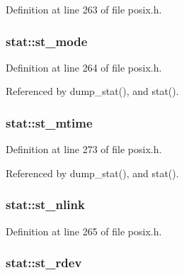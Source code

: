 Definition at line 263 of file posix.\-h.

\hypertarget{structstat_a5cbdd829011af82ba61e83773bbcbc7d}{
\subsubsection[{st\-\_\-mode}]{ stat\-::st\-\_\-mode}}\label{structstat_a5cbdd829011af82ba61e83773bbcbc7d}


Definition at line 264 of file posix.\-h.



Referenced by dump\-\_\-stat(), and stat().

\hypertarget{structstat_a77e235090f8cb6897f1c0ce65689006b}{
\subsubsection[{st\-\_\-mtime}]{ stat\-::st\-\_\-mtime}}\label{structstat_a77e235090f8cb6897f1c0ce65689006b}


Definition at line 273 of file posix.\-h.



Referenced by dump\-\_\-stat(), and stat().

\hypertarget{structstat_a0ed9092fa6c77a3251b9b9a4738ef84f}{
\subsubsection[{st\-\_\-nlink}]{ stat\-::st\-\_\-nlink}}\label{structstat_a0ed9092fa6c77a3251b9b9a4738ef84f}


Definition at line 265 of file posix.\-h.

\hypertarget{structstat_aa61e6c1a8a91c69f1d26f6700a0546cb}{
\subsubsection[{st\-\_\-rdev}]{ stat\-::st\-\_\-rdev}}\label{structstat_aa61e6c1a8a91c69f1d26f6700a0546cb}


